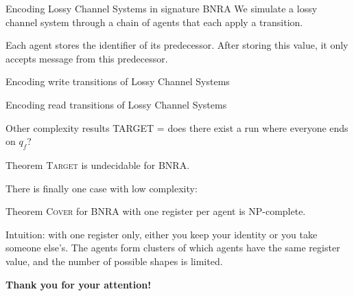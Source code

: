 \documentclass{beamer}
\newcommand{\COVER}{\textsc{Cover}\xspace}
\newcommand{\TARGET}{\textsc{Target}\xspace}
\begin{document}
\begin{frame}{Encoding Lossy Channel Systems in signature BNRA}
	We simulate a lossy channel system through a chain of agents that each apply a transition.
	
	Each agent stores the identifier of its predecessor. After storing this value, it only accepts message from this predecessor. 
	\centering
	
	
\end{frame}


\begin{frame}{Encoding write transitions of Lossy Channel Systems}
	\centering
	

\end{frame}

\begin{frame}{Encoding read transitions of Lossy Channel Systems}
	\centering
	 
\end{frame}



\begin{frame}{Other complexity results}
	TARGET = does there exist a run where everyone ends on $q_f$?
	
	\begin{block}{Theorem}
		{\TARGET} is undecidable for BNRA.
	\end{block}

	\pause

	There is finally one case with low complexity:
	\begin{block}{Theorem}
	\COVER{} for BNRA with one register per agent is NP-complete. 
	\end{block}
\pause
	Intuition: with one register only, either you keep your identity or you take someone else's. The agents form clusters of which agents have the same register value, and the number of possible shapes is limited. 


\end{frame}



\begin{frame}{}
	
	\Huge \textbf{Thank you for your attention!}
	
\end{frame}

\appendix
\begin{frame}
\end{frame}
\end{document}
